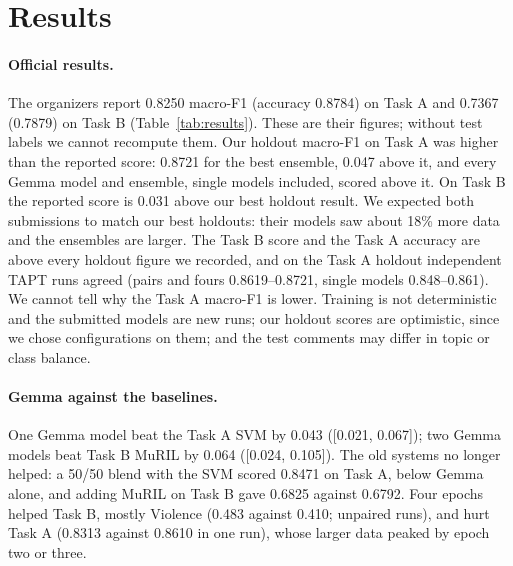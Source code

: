\documentclass[11pt]{article}
\newcommand{\taska}{Task A}
\newcommand{\taskb}{Task B}
\begin{document}
\section{Results}
\label{sec:results}


\paragraph{Official results.} The organizers report 0.8250 macro-F1 (accuracy
0.8784) on \taska{} and 0.7367 (0.7879) on \taskb{} (Table~\ref{tab:results}).
These are their figures; without test labels we cannot recompute them. Our
holdout macro-F1 on \taska{} was higher than the reported score: 0.8721 for the
best ensemble, 0.047 above it, and every Gemma model and ensemble, single models
included, scored above it. On \taskb{} the reported score is 0.031 above our best
holdout result. We expected both submissions to match our best holdouts: their
models saw about 18\% more data and the ensembles are larger. The \taskb{} score
and the \taska{} accuracy are above every holdout figure we recorded, and on the
\taska{} holdout independent TAPT runs agreed (pairs and fours 0.8619--0.8721,
single models 0.848--0.861). We cannot tell why the \taska{} macro-F1 is lower.
Training is not deterministic and the submitted models are new runs; our holdout
scores are optimistic, since we chose configurations on them; and the test
comments may differ in topic or class balance.

\paragraph{Gemma against the baselines.} One Gemma model beat the \taska{} SVM by
0.043 ([0.021, 0.067]); two Gemma models beat \taskb{} MuRIL by 0.064 ([0.024,
0.105]). The old systems no longer helped: a 50/50 blend with the SVM scored
0.8471 on \taska{}, below Gemma alone, and adding MuRIL on \taskb{} gave 0.6825
against 0.6792. Four epochs helped \taskb{}, mostly Violence (0.483 against 0.410;
unpaired runs), and hurt \taska{} (0.8313 against 0.8610 in one run), whose larger
data peaked by epoch two or three.
\end{document}
